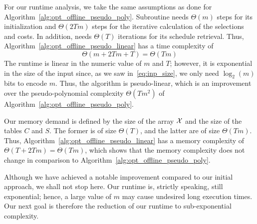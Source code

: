For our runtime analysis, we take the same assumptions as done for Algorithm~\ref{alg:opt_offline_pseudo_poly}. Subroutine  needs $\Theta(m)$ steps for its initialization and $\Theta(2Tm)$ steps for the iterative calculation of the selections and costs. In addition,  needs $\Theta(T)$ iterations for its schedule retrieval. Thus, Algorithm~\ref{alg:opt_offline_pseudo_linear} has a time complexity of
\begin{equation*}
	\Theta(m+2Tm+T)=\Theta(Tm)
\end{equation*}
The runtime is linear in the numeric value of $m$ and $T$; however, it is exponential in the size of the input since, as we saw in~\eqref{eq:inp_size}, we only need $\log_2(m)$ bits to encode $m$. Thus, the algorithm is pseudo-linear, which is an improvement over the pseudo-polynomial complexity $\Theta(Tm^2)$ of Algorithm~\ref{alg:opt_offline_pseudo_poly}.

Our memory demand is defined by the size of the array $\mathcal{X}$ and the size of the tables $C$ and $S$. The former is of size $\Theta(T)$, and the latter are of size $\Theta(Tm)$. Thus, Algorithm~\ref{alg:opt_offline_pseudo_linear} has a memory complexity of $\Theta(T+2Tm)=\Theta(Tm)$, which shows that the memory complexity does not change in comparison to Algorithm~\ref{alg:opt_offline_pseudo_poly}.

Although we have achieved a notable improvement compared to our initial approach, we shall not stop here. Our runtime is, strictly speaking, still exponential; hence, a large value of $m$ may cause undesired long execution times. Our next goal is therefore the reduction of our runtime to sub-exponential complexity.
